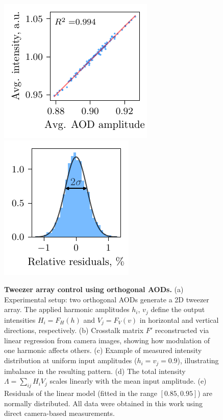 \begin{figure}
    \phantom{42}
    \includegraphics{fig-py/crosstalk-camera-amp.pdf}  
    \phantom{42}
    \includegraphics{fig-py/crosstalk-camera-res.pdf}
    \caption{
        \textbf{Tweezer array control using orthogonal AODs.}
        (a) Experimental setup: two orthogonal AODs generate a 2D tweezer array. The applied harmonic amplitudes $h_i$, $v_j$ define the output intensities $H_i = F_H(h)$ and $V_j = F_V(v)$ in horizontal and vertical directions, respectively. 
        (b) Crosstalk matrix $F'$ reconstructed via linear regression from camera images, showing how modulation of one harmonic affects others. 
        (c) Example of measured intensity distribution at uniform input amplitudes ($h_i = v_j = 0.9$), illustrating imbalance in the resulting pattern. 
        (d) The total intensity $\Lambda = \sum_{ij} H_i V_j$ scales linearly with the mean input amplitude. 
        (e) Residuals of the linear model (fitted in the range $[0.85, 0.95]$) are normally distributed. 
        All data were obtained in this work using direct camera-based measurements.
    }
    \label{fig:control}
\end{figure}



